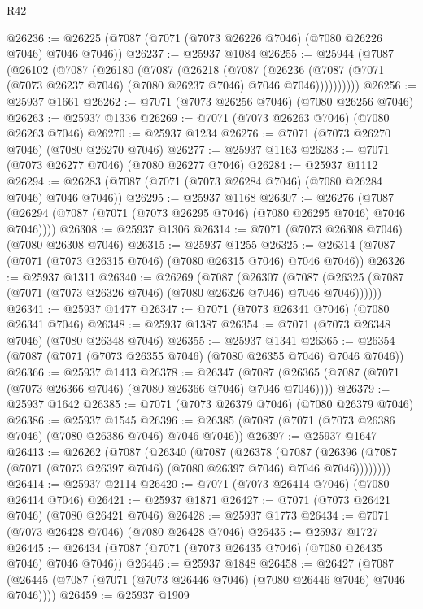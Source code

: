 \begin{lexlean}{R42}
\begin{coremodule}
{@26236 := @26225 (@7087 (@7071 (@7073 @26226 @7046) (@7080 @26226 @7046) @7046 @7046))
@26237 := @25937 @1084
@26255 := @25944
    (@7087
      (@26102
        (@7087
          (@26180
            (@7087
              (@26218
                (@7087
                  (@26236
                    (@7087 (@7071 (@7073 @26237 @7046) (@7080 @26237 @7046) @7046 @7046))))))))))
@26256 := @25937 @1661
@26262 := @7071 (@7073 @26256 @7046) (@7080 @26256 @7046)
@26263 := @25937 @1336
@26269 := @7071 (@7073 @26263 @7046) (@7080 @26263 @7046)
@26270 := @25937 @1234
@26276 := @7071 (@7073 @26270 @7046) (@7080 @26270 @7046)
@26277 := @25937 @1163
@26283 := @7071 (@7073 @26277 @7046) (@7080 @26277 @7046)
@26284 := @25937 @1112
@26294 := @26283 (@7087 (@7071 (@7073 @26284 @7046) (@7080 @26284 @7046) @7046 @7046))
@26295 := @25937 @1168
@26307 := @26276
    (@7087 (@26294 (@7087 (@7071 (@7073 @26295 @7046) (@7080 @26295 @7046) @7046 @7046))))
@26308 := @25937 @1306
@26314 := @7071 (@7073 @26308 @7046) (@7080 @26308 @7046)
@26315 := @25937 @1255
@26325 := @26314 (@7087 (@7071 (@7073 @26315 @7046) (@7080 @26315 @7046) @7046 @7046))
@26326 := @25937 @1311
@26340 := @26269
    (@7087
      (@26307
        (@7087 (@26325 (@7087 (@7071 (@7073 @26326 @7046) (@7080 @26326 @7046) @7046 @7046))))))
@26341 := @25937 @1477
@26347 := @7071 (@7073 @26341 @7046) (@7080 @26341 @7046)
@26348 := @25937 @1387
@26354 := @7071 (@7073 @26348 @7046) (@7080 @26348 @7046)
@26355 := @25937 @1341
@26365 := @26354 (@7087 (@7071 (@7073 @26355 @7046) (@7080 @26355 @7046) @7046 @7046))
@26366 := @25937 @1413
@26378 := @26347
    (@7087 (@26365 (@7087 (@7071 (@7073 @26366 @7046) (@7080 @26366 @7046) @7046 @7046))))
@26379 := @25937 @1642
@26385 := @7071 (@7073 @26379 @7046) (@7080 @26379 @7046)
@26386 := @25937 @1545
@26396 := @26385 (@7087 (@7071 (@7073 @26386 @7046) (@7080 @26386 @7046) @7046 @7046))
@26397 := @25937 @1647
@26413 := @26262
    (@7087
      (@26340
        (@7087
          (@26378
            (@7087
              (@26396 (@7087 (@7071 (@7073 @26397 @7046) (@7080 @26397 @7046) @7046 @7046))))))))
@26414 := @25937 @2114
@26420 := @7071 (@7073 @26414 @7046) (@7080 @26414 @7046)
@26421 := @25937 @1871
@26427 := @7071 (@7073 @26421 @7046) (@7080 @26421 @7046)
@26428 := @25937 @1773
@26434 := @7071 (@7073 @26428 @7046) (@7080 @26428 @7046)
@26435 := @25937 @1727
@26445 := @26434 (@7087 (@7071 (@7073 @26435 @7046) (@7080 @26435 @7046) @7046 @7046))
@26446 := @25937 @1848
@26458 := @26427
    (@7087 (@26445 (@7087 (@7071 (@7073 @26446 @7046) (@7080 @26446 @7046) @7046 @7046))))
@26459 := @25937 @1909
}
\end{coremodule}
\end{lexlean}

